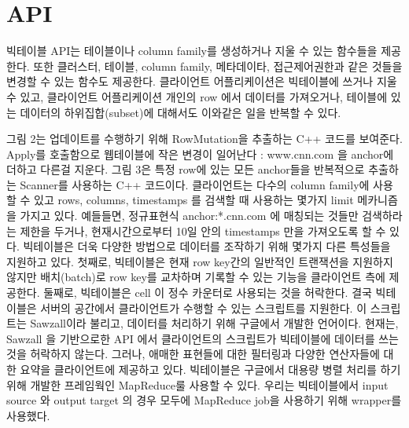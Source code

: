 \documentclass[twocolumn]{article}
\begin{document}
 
\section{API}
 빅테이블 API는 테이블이나 column family를 생성하거나 지울 수 있는 함수들을 제공한다. 또한 클러스터, 테이블, column family, 메타데이타, 접근제어권한과 같은 것들을 변경할 수 있는 함수도 제공한다.
클라이언트 어플리케이션은 빅테이블에 쓰거나 지울 수 있고, 클라이언트 어플리케이션 개인의 row 에서 데이터를 가져오거나, 테이블에 있는 데이터의 하위집합(subset)에 대해서도 이와같은 일을 반복할 수 있다.

 
 그림 2는 업데이트를 수행하기 위해 RowMutation을 추출하는 C++ 코드를 보여준다. Apply를 호출함으로 웹테이블에 작은 변경이 일어난다 : www.cnn.com 을 anchor에 더하고 다른걸 지운다.
그림 3은 특정 row에 있는 모든 anchor들을 반복적으로 추출하는 Scanner를 사용하는 C++ 코드이다. 클라이언트는 다수의 column family에 사용할 수 있고 rows, columns, timestamps 를 검색할 때 사용하는 몇가지 limit 메카니즘을 가지고 있다. 예들들면, 정규표현식 anchor:*.cnn.com 에 매칭되는 것들만 검색하라는 제한을 두거나, 현재시간으로부터 10일 안의 timestamps 만을 가져오도록 할 수 있다.
빅테이블은 더욱 다양한 방법으로 데이터를 조작하기 위해 몇가지 다른 특성들을 지원하고 있다. 첫째로, 빅테이블은 현재 row key간의 일반적인 트랜잭션을 지원하지 않지만 배치(batch)로 row key를 교차하며 기록할 수 있는 기능을 클라이언트 측에 제공한다. 둘째로, 빅테이블은 cell 이 정수 카운터로 사용되는 것을 허락한다. 결국 빅테이블은 서버의 공간에서 클라이언트가 수행할 수 있는 스크립트를 지원한다. 이 스크립트는 Sawzall이라 불리고, 데이터를 처리하기 위해 구글에서 개발한 언어이다. 현재는, Sawzall 을 기반으로한 API 에서 클라이언트의 스크립트가 빅테이블에 데이터를 쓰는 것을 허락하지 않는다. 그러나, 애매한 표현들에 대한 필터링과 다양한 연산자들에 대한 요약을 클라이언트에 제공하고 있다.
 빅테이블은 구글에서 대용량 병렬 처리를 하기위해 개발한 프레임웍인 MapReduce룰 사용할 수 있다. 우리는 빅테이블에서 input source 와 output target 의 경우 모두에 MapReduce job을 사용하기 위해 wrapper를 사용했다.
 
\end{document}
